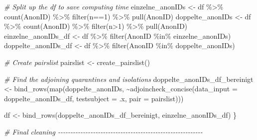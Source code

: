 \documentclass[
]{article}
\newenvironment{Shaded}{\begin{snugshade}}{\end{snugshade}}
\newcommand{\AttributeTok}[1]{\textcolor[rgb]{0.77,0.63,0.00}{#1}}
\newcommand{\CommentTok}[1]{\textcolor[rgb]{0.56,0.35,0.01}{\textit{#1}}}
\newcommand{\DecValTok}[1]{\textcolor[rgb]{0.00,0.00,0.81}{#1}}
\newcommand{\FunctionTok}[1]{\textcolor[rgb]{0.00,0.00,0.00}{#1}}
\newcommand{\NormalTok}[1]{#1}
\newcommand{\OtherTok}[1]{\textcolor[rgb]{0.56,0.35,0.01}{#1}}
\newcommand{\SpecialCharTok}[1]{\textcolor[rgb]{0.00,0.00,0.00}{#1}}
\begin{document}
\begin{Shaded}
\begin{Highlighting}[]
  \CommentTok{\# Split up the df to save computing time}
\NormalTok{  einzelne\_anonIDs }\OtherTok{\textless{}{-}}\NormalTok{ df }\SpecialCharTok{\%\textgreater{}\%} \FunctionTok{count}\NormalTok{(AnonID) }\SpecialCharTok{\%\textgreater{}\%} \FunctionTok{filter}\NormalTok{(n}\SpecialCharTok{==}\DecValTok{1}\NormalTok{) }\SpecialCharTok{\%\textgreater{}\%} \FunctionTok{pull}\NormalTok{(AnonID)}
\NormalTok{  doppelte\_anonIDs }\OtherTok{\textless{}{-}}\NormalTok{ df }\SpecialCharTok{\%\textgreater{}\%} \FunctionTok{count}\NormalTok{(AnonID) }\SpecialCharTok{\%\textgreater{}\%} \FunctionTok{filter}\NormalTok{(n}\SpecialCharTok{\textgreater{}}\DecValTok{1}\NormalTok{) }\SpecialCharTok{\%\textgreater{}\%} \FunctionTok{pull}\NormalTok{(AnonID)}
\NormalTok{  einzelne\_anonIDs\_df }\OtherTok{\textless{}{-}}\NormalTok{ df }\SpecialCharTok{\%\textgreater{}\%} \FunctionTok{filter}\NormalTok{(AnonID }\SpecialCharTok{\%in\%}\NormalTok{ einzelne\_anonIDs)}
\NormalTok{  doppelte\_anonIDs\_df }\OtherTok{\textless{}{-}}\NormalTok{ df }\SpecialCharTok{\%\textgreater{}\%} \FunctionTok{filter}\NormalTok{(AnonID }\SpecialCharTok{\%in\%}\NormalTok{ doppelte\_anonIDs)}
  
  \CommentTok{\# Create pairslist}
\NormalTok{  pairslist }\OtherTok{\textless{}{-}} \FunctionTok{create\_pairslist}\NormalTok{()}
  
  \CommentTok{\# Find the adjoining quarantines and isolations}
\NormalTok{  doppelte\_anonIDs\_df\_bereinigt }\OtherTok{\textless{}{-}} \FunctionTok{bind\_rows}\NormalTok{(}\FunctionTok{map}\NormalTok{(doppelte\_anonIDs, }\SpecialCharTok{\textasciitilde{}}\FunctionTok{adjoincheck\_concise}\NormalTok{(}\AttributeTok{data\_input =}\NormalTok{ doppelte\_anonIDs\_df, }
                                                                                        \AttributeTok{testsubject =}\NormalTok{ .x,}
                                                                                        \AttributeTok{pair =}\NormalTok{ pairslist)))}
  
\NormalTok{  df }\OtherTok{\textless{}{-}} \FunctionTok{bind\_rows}\NormalTok{(doppelte\_anonIDs\_df\_bereinigt, einzelne\_anonIDs\_df)}
\NormalTok{\}}


\CommentTok{\# Final cleaning {-}{-}{-}{-}{-}{-}{-}{-}{-}{-}{-}{-}{-}{-}{-}{-}{-}{-}{-}{-}{-}{-}{-}{-}{-}{-}{-}{-}{-}{-}{-}{-}{-}{-}{-}{-}{-}{-}{-}{-}{-}{-}{-}{-}{-}{-}{-}{-}{-}{-}{-}{-}{-}{-}{-}{-}{-}{-}}



\end{Highlighting}
\end{Shaded}
\end{document}
